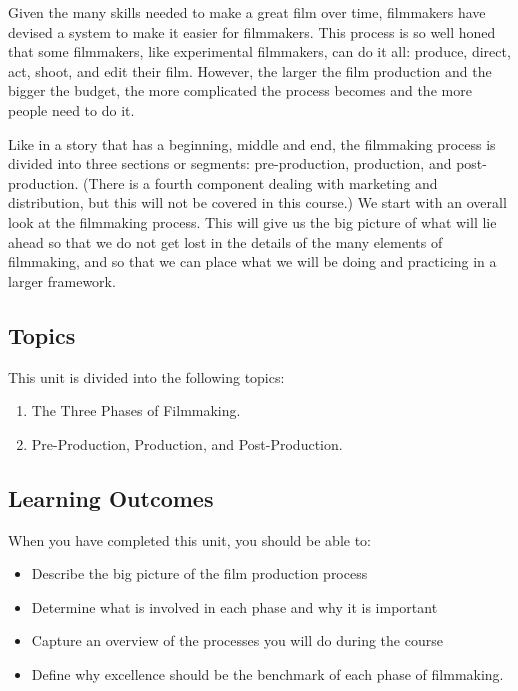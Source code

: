 \documentclass[
]{book}
\providecommand{\tightlist}{%
  \setlength{\itemsep}{0pt}\setlength{\parskip}{0pt}}
\begin{document}
Given the many skills needed to make a great film over time, filmmakers have devised a system to make it easier for filmmakers. This process is so well honed that some filmmakers, like experimental filmmakers, can do it all: produce, direct, act, shoot, and edit their film. However, the larger the film production and the bigger the budget, the more complicated the process becomes and the more people need to do it.

Like in a story that has a beginning, middle and end, the filmmaking process is divided into three sections or segments: pre-production, production, and post-production. (There is a fourth component dealing with marketing and distribution, but this will not be covered in this course.) We start with an overall look at the filmmaking process. This will give us the big picture of what will lie ahead so that we do not get lost in the details of the many elements of filmmaking, and so that we can place what we will be doing and practicing in a larger framework.

\hypertarget{topics-1}{%
\subsection*{Topics}\label{topics-1}}

This unit is divided into the following topics:

\begin{enumerate}
\def\labelenumi{\arabic{enumi}.}
\tightlist
\item
  The Three Phases of Filmmaking.
\item
  Pre-Production, Production, and Post-Production.
\end{enumerate}

\hypertarget{learning-outcomes-1}{%
\subsection*{Learning Outcomes}\label{learning-outcomes-1}}

When you have completed this unit, you should be able to:

\begin{itemize}
\tightlist
\item
  Describe the big picture of the film production process\\
\item
  Determine what is involved in each phase and why it is important\\
\item
  Capture an overview of the processes you will do during the course\\
\item
  Define why excellence should be the benchmark of each phase of filmmaking.
\end{itemize}
\end{document}
